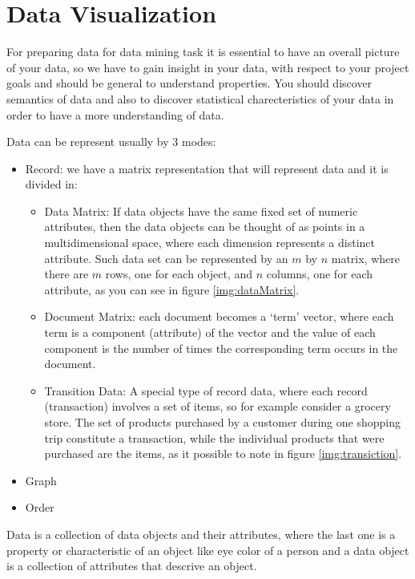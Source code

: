 \chapter{Data Visualization}
For preparing data for data mining task it is essential to have an overall picture of your data, so we have to
gain insight in your data, with respect to your project goals and should be general to understand properties.\newline
You should discover semantics of data and also to discover statistical charecteristics of your data in
order to have a more understanding of data.

Data can be represent usually by $3$ modes:
\begin{itemize}
    \item Record: we have a matrix representation that will represent data and it is divided in:
            \begin{itemize}
                \item Data Matrix: If data objects have the same fixed set of numeric attributes,
                      then the data objects can be thought of as points in a multidimensional space,
                      where each dimension represents a distinct attribute.\newline
                      Such data set can be represented by an $m$ by $n$ matrix, where there are $m$ rows,
                      one for each object, and $n$ columns, one for each attribute,
                      as you can see in figure \ref{img:dataMatrix}.
                \item Document Matrix: each document becomes a ‘term’ vector, where each term 
                      is a component (attribute) of the vector and the value of each component is 
                      the number of times the corresponding term occurs in the document.
                \item Transition Data: A special type of record data, where each record (transaction)
                      involves a set of items, so for example consider a grocery store.\newline
                      The set of products purchased by a customer during one shopping trip constitute a transaction,
                      while the individual products that were purchased are the items,
                      as it possible to note in figure \ref{img:transiction}.
            \end{itemize}
    \item Graph
    \item Order
\end{itemize}
Data is a collection of data objects and their attributes, where the last one is a property or 
characteristic of an object like eye color of a person and a data object is a collection of 
attributes that descrive an object.

